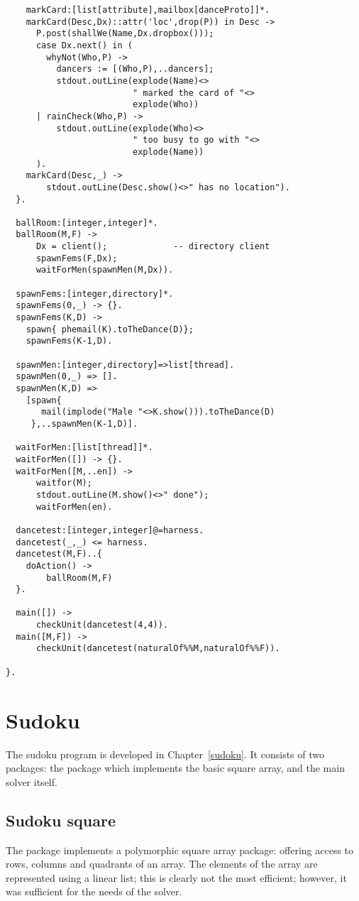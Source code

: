 \begin{verbatim}
    markCard:[list[attribute],mailbox[danceProto]]*.
    markCard(Desc,Dx)::attr('loc',drop(P)) in Desc ->
      P.post(shallWe(Name,Dx.dropbox()));
      case Dx.next() in (
        whyNot(Who,P) -> 
          dancers := [(Who,P),..dancers];
          stdout.outLine(explode(Name)<>
                         " marked the card of "<>
                         explode(Who))
      | rainCheck(Who,P) -> 
          stdout.outLine(explode(Who)<>
                         " too busy to go with "<>
                         explode(Name))
      ).
    markCard(Desc,_) ->
        stdout.outLine(Desc.show()<>" has no location").
  }.

  ballRoom:[integer,integer]*.
  ballRoom(M,F) ->
      Dx = client();			 -- directory client
      spawnFems(F,Dx);
      waitForMen(spawnMen(M,Dx)).
    
  spawnFems:[integer,directory]*.
  spawnFems(0,_) -> {}.
  spawnFems(K,D) -> 
    spawn{ phemail(K).toTheDance(D)};
    spawnFems(K-1,D).
  
  spawnMen:[integer,directory]=>list[thread].
  spawnMen(0,_) => [].
  spawnMen(K,D) => 
    [spawn{
       mail(implode("Male "<>K.show())).toTheDance(D)
     },..spawnMen(K-1,D)].
  
  waitForMen:[list[thread]]*.
  waitForMen([]) -> {}.
  waitForMen([M,..en]) ->
      waitfor(M);
      stdout.outLine(M.show()<>" done");
      waitForMen(en).

  dancetest:[integer,integer]@=harness.
  dancetest(_,_) <= harness.
  dancetest(M,F)..{
    doAction() ->
        ballRoom(M,F)
  }.

  main([]) ->
      checkUnit(dancetest(4,4)).
  main([M,F]) ->
      checkUnit(dancetest(naturalOf%%M,naturalOf%%F)).

}.
\end{verbatim}

\section{Sudoku}
\label{sample:sudoku}
The sudoku program is developed in Chapter~\vref{sudoku}. It consists of two packages: the  package which implements the basic square array, and the main solver itself.

\subsection{Sudoku square}
\label{sample:sudoku:square}
The  package implements a polymorphic square array package: offering access to rows, columns and quadrants of an array. The elements of the array are represented using a linear list; this is clearly not the most efficient; however, it was sufficient for the needs of the solver.

